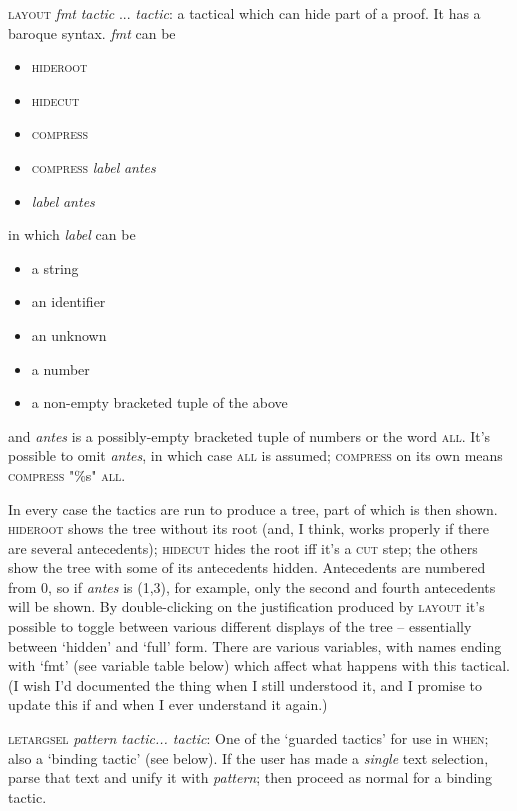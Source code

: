 \textsc{layout} \textit{fmt} \textit{tactic} ... \textit{tactic}: a tactical which can hide part of a proof. It has a baroque syntax. \textit{fmt} can be 
\begin{itemize}
\item \textsc{hideroot}
\item \textsc{hidecut} 
\item \textsc{compress}
\item \textsc{compress} \textit{label} \textit{antes}
\item \textit{label} \textit{antes}
\end{itemize}
in which \textit{label} can be \begin{itemize}
\item a string
\item an identifier
\item an unknown
\item a number 
\item a non-empty bracketed tuple of the above
\end{itemize}
and \textit{antes} is a possibly-empty bracketed tuple of numbers or the word \textsc{all}. It's possible to omit \textit{antes}, in which case \textsc{all} is assumed; \textsc{compress} on its own means \textsc{compress} "\%s" \textsc{all}.

In every case the tactics are run to produce a tree, part of which is then shown. \textsc{hideroot} shows the tree without its root (and, I think, works properly if there are several antecedents); \textsc{hidecut} hides the root iff it's a \textsc{cut} step; the others show the tree with some of its antecedents hidden. Antecedents are numbered from 0, so if \textit{antes} is (1,3), for example, only the second and fourth antecedents will be shown. By double-clicking on the justification produced by \textsc{layout} it's possible to toggle between various different displays of the tree -- essentially between `hidden' and `full' form. There are various variables, with names ending with `fmt' (see variable table below) which affect what happens with this tactical. (I wish I'd documented the thing when I still understood it, and I promise to update this if and when I ever understand it again.)

\textsc{letargsel} \textit{pattern tactic... tactic}: One of the `guarded tactics' for use in \textsc{when}; also a `binding tactic' (see below). If the user has made a \textit{single} text selection, parse that text and unify it with \textit{pattern}; then proceed as normal for a binding tactic.

